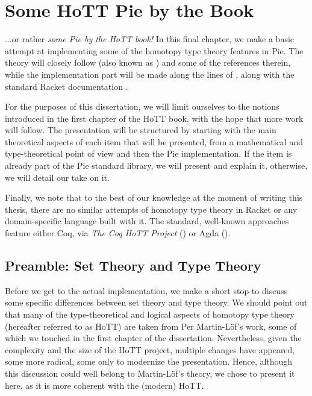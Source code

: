\chapter{Some HoTT Pie by the Book}

...or rather \emph{some Pie by the HoTT book!} In this final chapter, we make
a basic attempt at implementing some of the homotopy type theory features in
Pie. The theory will closely follow \cite{hott} (also known as
) and some of the references therein, while the implementation
part will be made along the lines of \cite{typer}, along with the standard
Racket documentation \cite{racket}.

For the purposes of this dissertation, we will limit ourselves to the notions
introduced in the first chapter of the HoTT book, with the hope that more
work will follow. The presentation will be structured by starting with the
main theoretical aspects of each item that will be presented, from a mathematical
and type-theoretical point of view and then the Pie implementation. If the
item is already part of the Pie standard library, we will present and explain
it, otherwise, we will detail our take on it.

Finally, we note that to the best of our knowledge at the moment of writing
this thesis, there are no similar attempts of homotopy type theory in Racket
or any domain-specific language built with it. The standard, well-known
approaches feature either Coq, via \emph{The Coq HoTT Project} (\cite{coqhott})
or Agda (\cite{agdahott}).


\section{Preamble: Set Theory and Type Theory}

Before we get to the actual implementation, we make a short stop to discuss
some specific differences between set theory and type theory. We should point
out that many of the type-theoretical and logical aspects of homotopy type
theory (hereafter referred to as HoTT) are taken from Per Martin-L\"{of}'s
work, some of which we touched in the first chapter of the dissertation.
Nevertheless, given the complexity and the size of the HoTT project, multiple
changes have appeared, some more radical, some only to modernize the
presentation. Hence, although this discussion could well belong to
Martin-L\"{o}f's theory, we chose to present it here, as it is more coherent
with the (modern) HoTT.

